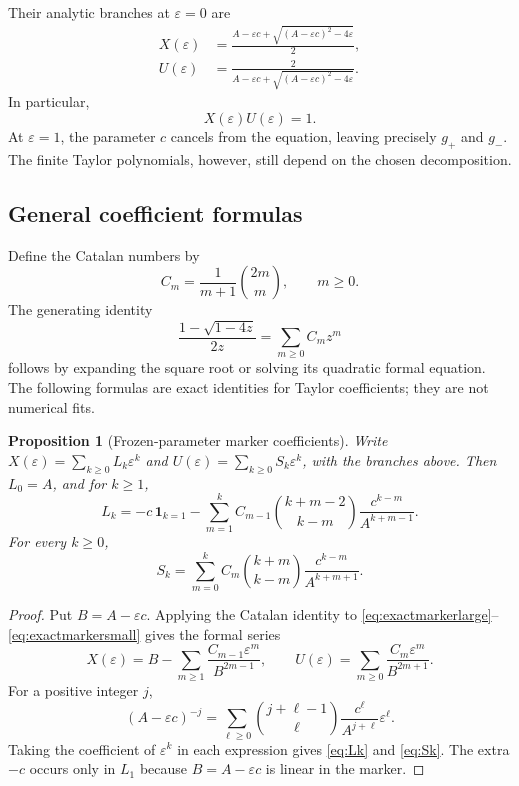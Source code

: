 \documentclass[11pt,letterpaper]{article}
\newtheorem{proposition}[theorem]{Proposition}
\theoremstyle{remark}\newtheorem{remark}[theorem]{Remark}
\newcommand{\eps}{\varepsilon}
\begin{document}
Their analytic branches at $\eps=0$ are
\begin{align}
 X(\eps)&=\frac{A-\eps c+\sqrt{(A-\eps c)^2-4\eps}}2,\label{eq:exactmarkerlarge}\\
 U(\eps)&=\frac{2}{A-\eps c+\sqrt{(A-\eps c)^2-4\eps}}.\label{eq:exactmarkersmall}
\end{align}
In particular,
\begin{equation}\label{eq:reciprocalmarker}
 X(\eps)U(\eps)=1.
\end{equation}
At $\eps=1$, the parameter $c$ cancels from the equation, leaving precisely
$g_+$ and $g_-$. The finite Taylor polynomials, however, still depend on the
chosen decomposition.

\subsection{General coefficient formulas}
Define the Catalan numbers by
\[
 C_m=\frac1{m+1}\binom{2m}{m},\qquad m\geq0.
\]
The generating identity
\[
 \frac{1-\sqrt{1-4z}}{2z}=\sum_{m\geq0}C_mz^m
\]
follows by expanding the square root or solving its quadratic formal equation.
The following formulas are exact identities for Taylor coefficients; they are
not numerical fits.

\begin{proposition}[Frozen-parameter marker coefficients]\label{prop:coeffs}
Write $X(\eps)=\sum_{k\geq0}L_k\eps^k$ and
$U(\eps)=\sum_{k\geq0}S_k\eps^k$, with the branches above. Then $L_0=A$, and
for $k\geq1$,
\begin{equation}\label{eq:Lk}
 L_k=-c\,\mathbf1_{k=1}
 -\sum_{m=1}^{k}C_{m-1}\binom{k+m-2}{k-m}
                    \frac{c^{k-m}}{A^{k+m-1}}.
\end{equation}
For every $k\geq0$,
\begin{equation}\label{eq:Sk}
 S_k=\sum_{m=0}^{k}C_m\binom{k+m}{k-m}
                   \frac{c^{k-m}}{A^{k+m+1}}.
\end{equation}
\end{proposition}
\begin{proof}
Put $B=A-\eps c$. Applying the Catalan identity to
\eqref{eq:exactmarkerlarge}--\eqref{eq:exactmarkersmall} gives the formal series
\[
 X(\eps)=B-\sum_{m\geq1}\frac{C_{m-1}\eps^m}{B^{2m-1}},
 \qquad
 U(\eps)=\sum_{m\geq0}\frac{C_m\eps^m}{B^{2m+1}}.
\]
For a positive integer $j$,
\[
 (A-\eps c)^{-j}
 =\sum_{\ell\geq0}\binom{j+\ell-1}{\ell}
       \frac{c^\ell}{A^{j+\ell}}\eps^\ell.
\]
Taking the coefficient of $\eps^k$ in each expression gives
\eqref{eq:Lk} and \eqref{eq:Sk}. The extra $-c$ occurs only in $L_1$ because
$B=A-\eps c$ is linear in the marker.
\end{proof}
\end{document}
